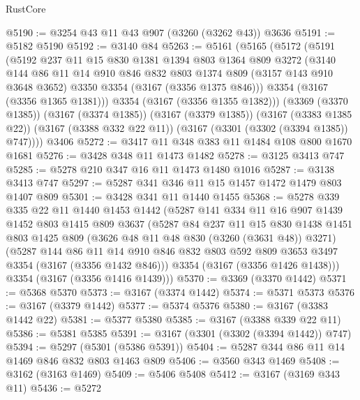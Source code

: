 \begin{lexlean}{RustCore}
\begin{coremodule}
@5190 := @3254 @43 @11 @43 @907 (@3260 (@3262 @43)) @3636
@5191 := @5182 @5190
@5192 := @3140 @84
@5263 := @5161
    (@5165
      (@5172
        (@5191
          (@5192
            @237
            @11
            @15
            @830
            @1381
            @1394
            @803
            @1364
            @809
            @3272
            (@3140
              @144
              @86
              @11
              @14
              @910
              @846
              @832
              @803
              @1374
              @809
              (@3157 @143 @910 @3648 @3652)
              @3350
              @3354
              (@3167 (@3356 @1375 @846)))
            @3354
            (@3167 (@3356 @1365 @1381)))
          @3354
          (@3167 (@3356 @1355 @1382)))
        (@3369 (@3370 @1385))
        (@3167 (@3374 @1385))
        (@3167 (@3379 @1385))
        (@3167 (@3383 @1385 @22))
        (@3167 (@3388 @332 @22 @11))
        (@3167 (@3301 (@3302 (@3394 @1385)) @747))))
    @3406
@5272 := @3417 @11 @348 @383 @11 @1484 @108 @800 @1670 @1681
@5276 := @3428 @348 @11 @1473 @1482
@5278 := @3125 @3413 @747
@5285 := @5278 @210 @347 @16 @11 @1473 @1480 @1016
@5287 := @3138 @3413 @747
@5297 := @5287 @341 @346 @11 @15 @1457 @1472 @1479 @803 @1407 @809
@5301 := @3428 @341 @11 @1440 @1455
@5368 := @5278
    @339
    @335
    @22
    @11
    @1440
    @1453
    @1442
    (@5287
      @141
      @334
      @11
      @16
      @907
      @1439
      @1452
      @803
      @1415
      @809
      @3637
      (@5287
        @84
        @237
        @11
        @15
        @830
        @1438
        @1451
        @803
        @1425
        @809
        (@3626 @48 @11 @48 @830 (@3260 (@3631 @48)) @3271)
        (@5287
          @144
          @86
          @11
          @14
          @910
          @846
          @832
          @803
          @592
          @809
          @3653
          @3497
          @3354
          (@3167 (@3356 @1432 @846)))
        @3354
        (@3167 (@3356 @1426 @1438)))
      @3354
      (@3167 (@3356 @1416 @1439)))
@5370 := @3369 (@3370 @1442)
@5371 := @5368 @5370
@5373 := @3167 (@3374 @1442)
@5374 := @5371 @5373
@5376 := @3167 (@3379 @1442)
@5377 := @5374 @5376
@5380 := @3167 (@3383 @1442 @22)
@5381 := @5377 @5380
@5385 := @3167 (@3388 @339 @22 @11)
@5386 := @5381 @5385
@5391 := @3167 (@3301 (@3302 (@3394 @1442)) @747)
@5394 := @5297 (@5301 (@5386 @5391))
@5404 := @5287 @344 @86 @11 @14 @1469 @846 @832 @803 @1463 @809
@5406 := @3560 @343 @1469
@5408 := @3162 (@3163 @1469)
@5409 := @5406 @5408
@5412 := @3167 (@3169 @343 @11)
@5436 := @5272

\end{coremodule}
\end{lexlean}
